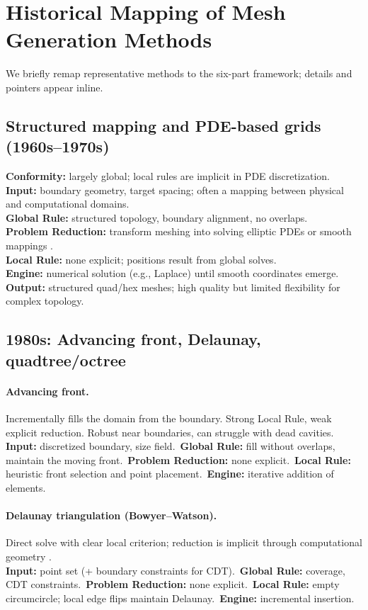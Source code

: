 \section{Historical Mapping of Mesh Generation Methods}
We briefly remap representative methods to the six-part framework; details and pointers appear inline.

\subsection{Structured mapping and PDE-based grids (1960s--1970s)}
\textbf{Conformity:} largely global; local rules are implicit in PDE discretization.
\\\textbf{Input:} boundary geometry, target spacing; often a mapping between physical and computational domains.
\\\textbf{Global Rule:} structured topology, boundary alignment, no overlaps.
\\\textbf{Problem Reduction:} transform meshing into solving elliptic PDEs or smooth mappings \citep{thompson1985grid}.
\\\textbf{Local Rule:} none explicit; positions result from global solves.
\\\textbf{Engine:} numerical solution (e.g., Laplace) until smooth coordinates emerge.
\\\textbf{Output:} structured quad/hex meshes; high quality but limited flexibility for complex topology.

\subsection{1980s: Advancing front, Delaunay, quadtree/octree}
\paragraph{Advancing front.} Incrementally fills the domain from the boundary. Strong Local Rule, weak explicit reduction. Robust near boundaries, can struggle with dead cavities.
\\\textbf{Input:} discretized boundary, size field.\
\textbf{Global Rule:} fill without overlaps, maintain the moving front.\
\textbf{Problem Reduction:} none explicit.\
\textbf{Local Rule:} heuristic front selection and point placement.\
\textbf{Engine:} iterative addition of elements.

\paragraph{Delaunay triangulation (Bowyer--Watson).} Direct solve with clear local criterion; reduction is implicit through computational geometry \citep{bowyer1981computing,watson1981computing}.
\\\textbf{Input:} point set (+ boundary constraints for CDT).\
\textbf{Global Rule:} coverage, CDT constraints.\
\textbf{Problem Reduction:} none explicit.\
\textbf{Local Rule:} empty circumcircle; local edge flips maintain Delaunay.\
\textbf{Engine:} incremental insertion.


